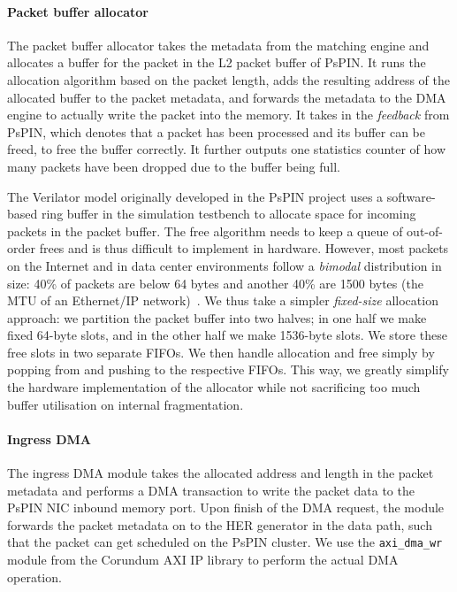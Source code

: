 
\paragraph{Packet buffer allocator} The packet buffer allocator takes the metadata from the matching engine and allocates a buffer for the packet in the L2 packet buffer of PsPIN.  It runs the allocation algorithm based on the packet length, adds the resulting address of the allocated buffer to the packet metadata, and forwards the metadata to the DMA engine to actually write the packet into the memory.  It takes in the \emph{feedback} from PsPIN, which denotes that a packet has been processed and its buffer can be freed, to free the buffer correctly.  It further outputs one statistics counter of how many packets have been dropped due to the buffer being full.

The Verilator model originally developed in the PsPIN project uses a software-based ring buffer in the simulation testbench to allocate space for incoming packets in the packet buffer.  The free algorithm needs to keep a queue of out-of-order frees and is thus difficult to implement in hardware.  However, most packets on the Internet and in data center environments follow a \emph{bimodal} distribution in size: 40\% of packets are below 64 bytes and another 40\% are 1500 bytes (the MTU of an Ethernet/IP network)~\cite{john_analysis_2007,benson_understanding_2009}.  We thus take a simpler \emph{fixed-size} allocation approach: we partition the packet buffer into two halves; in one half we make fixed 64-byte slots, and in the other half we make 1536-byte slots.  We store these free slots in two separate FIFOs.  We then handle allocation and free simply by popping from and pushing to the respective FIFOs.  This way, we greatly simplify the hardware implementation of the allocator while not sacrificing too much buffer utilisation on internal fragmentation.


\paragraph{Ingress DMA} The ingress DMA module takes the allocated address and length in the packet metadata and performs a DMA transaction to write the packet data to the PsPIN NIC inbound memory port.  Upon finish of the DMA request, the module forwards the packet metadata on to the HER generator in the data path, such that the packet can get scheduled on the PsPIN cluster.  We use the \texttt{axi\_\-dma\_\-wr} module from the Corundum AXI IP library to perform the actual DMA operation.


